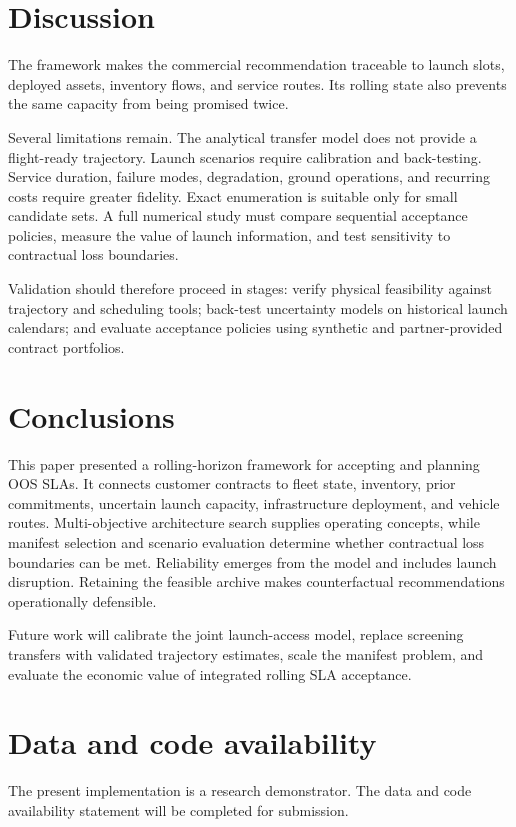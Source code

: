 \documentclass[review,12pt,authoryear]{elsarticle}
\begin{document}
\section{Discussion}
\label{sec:discussion}

The framework makes the commercial recommendation traceable to launch slots,
deployed assets, inventory flows, and service routes. Its rolling state also
prevents the same capacity from being promised twice.

Several limitations remain. The analytical transfer model does not provide a
flight-ready trajectory. Launch scenarios require calibration and back-testing.
Service duration, failure modes, degradation, ground operations, and recurring
costs require greater fidelity. Exact enumeration is suitable only for small
candidate sets. A full numerical study must compare sequential acceptance
policies, measure the value of launch information, and test sensitivity to
contractual loss boundaries.

Validation should therefore proceed in stages: verify physical feasibility
against trajectory and scheduling tools; back-test uncertainty models on
historical launch calendars; and evaluate acceptance policies using synthetic
and partner-provided contract portfolios.

\section{Conclusions}
\label{sec:conclusion}

This paper presented a rolling-horizon framework for accepting and planning OOS
SLAs. It connects customer contracts to fleet state, inventory, prior
commitments, uncertain launch capacity, infrastructure deployment, and vehicle
routes. Multi-objective architecture search supplies operating concepts, while
manifest selection and scenario evaluation determine whether contractual loss
boundaries can be met. Reliability emerges from the model and includes launch
disruption. Retaining the feasible archive makes counterfactual recommendations
operationally defensible.

Future work will calibrate the joint launch-access model, replace screening
transfers with validated trajectory estimates, scale the manifest problem, and
evaluate the economic value of integrated rolling SLA acceptance.

\section*{Data and code availability}
The present implementation is a research demonstrator. The data and code
availability statement will be completed for submission.
\end{document}

